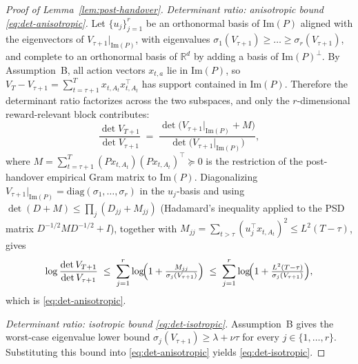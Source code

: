 \documentclass{article}
\theoremstyle{definition}
\theoremstyle{remark}
\theoremstyle{remark}
\begin{document}
\begin{proof}[Proof of Lemma~\ref{lem:post-handover}]
\emph{Determinant ratio: anisotropic bound \eqref{eq:det-anisotropic}.}
Let $\{u_j\}_{j=1}^r$ be an orthonormal basis of $\mathrm{Im}(P)$ aligned
with the eigenvectors of $V_{\tau+1}|_{\mathrm{Im}(P)}$, with eigenvalues
$\sigma_1(V_{\tau+1})\ge\dots\ge\sigma_r(V_{\tau+1})$, and complete to an
orthonormal basis of $\mathbb{R}^d$ by adding a basis of $\mathrm{Im}(P)^\perp$.
By Assumption~B, all action vectors $x_{t,a}$ lie in $\mathrm{Im}(P)$, so
$V_T-V_{\tau+1}=\sum_{t=\tau+1}^{T}x_{t,A_t}x_{t,A_t}^\top$ has support
contained in $\mathrm{Im}(P)$. Therefore the determinant ratio factorizes
across the two subspaces, and only the $r$-dimensional reward-relevant
block contributes:
\[
\dfrac{\det V_{T+1}}{\det V_{\tau+1}}
\;=\;
\dfrac{\det\bigl(V_{\tau+1}|_{\mathrm{Im}(P)}+M\bigr)}
      {\det\bigl(V_{\tau+1}|_{\mathrm{Im}(P)}\bigr)},
\]
where $M=\sum_{t=\tau+1}^T(P x_{t,A_t})(P x_{t,A_t})^\top\succeq 0$ is the
restriction of the post-handover empirical Gram matrix to $\mathrm{Im}(P)$.
Diagonalizing $V_{\tau+1}|_{\mathrm{Im}(P)}=\mathrm{diag}(\sigma_1,\dots,\sigma_r)$
in the $u_j$-basis and using
$\det(D+M)\le\prod_j(D_{jj}+M_{jj})$ (Hadamard's inequality applied to the
PSD matrix $D^{-1/2}MD^{-1/2}+I$), together with
$M_{jj}=\sum_{t>\tau}(u_j^\top x_{t,A_t})^2\le L^2(T-\tau)$, gives
\[
\log\dfrac{\det V_{T+1}}{\det V_{\tau+1}}
\;\le\;
\sum_{j=1}^{r}\log\!\Bigl(1+\tfrac{M_{jj}}{\sigma_j(V_{\tau+1})}\Bigr)
\;\le\;
\sum_{j=1}^{r}\log\!\Bigl(1+\tfrac{L^2(T-\tau)}{\sigma_j(V_{\tau+1})}\Bigr),
\]
which is \eqref{eq:det-anisotropic}.

\emph{Determinant ratio: isotropic bound \eqref{eq:det-isotropic}.}
Assumption~B gives the worst-case eigenvalue lower bound
$\sigma_j(V_{\tau+1})\ge\lambda+\nu\tau$ for every $j\in\{1,\dots,r\}$.
Substituting this bound into \eqref{eq:det-anisotropic} yields
\eqref{eq:det-isotropic}.
\end{proof}
\end{document}
